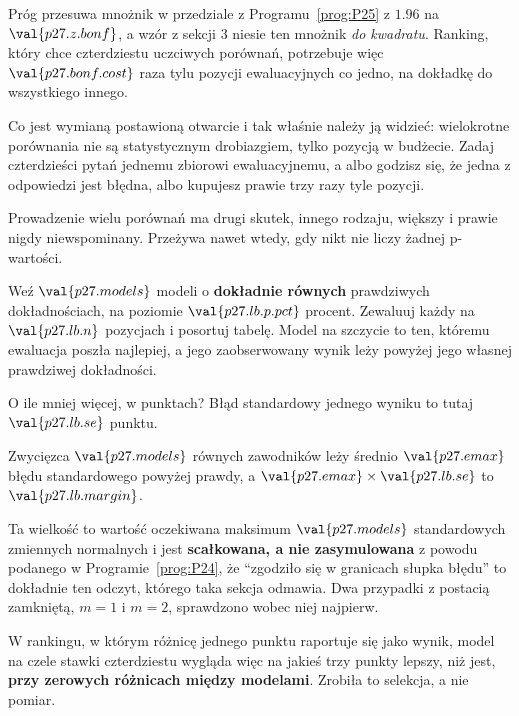\begin{fr}

Próg przesuwa mnożnik w przedziale z Programu~\ref{prog:P25} z
$\num{1.96}$ na $\val{p27.z.bonf}$, a wzór z sekcji 3 niesie ten mnożnik
\emph{do kwadratu}. Ranking, który chce czterdziestu uczciwych porównań,
potrzebuje więc $\val{p27.bonf.cost}$ raza tylu pozycji ewaluacyjnych co
jedno, na dokładkę do wszystkiego innego.

Co jest wymianą postawioną otwarcie i tak właśnie należy ją widzieć:
wielokrotne porównania nie są statystycznym drobiazgiem, tylko pozycją w
budżecie. Zadaj czterdzieści pytań jednemu zbiorowi ewaluacyjnemu, a albo
godzisz się, że jedna z odpowiedzi jest błędna, albo kupujesz prawie trzy razy
tyle pozycji.
\end{fr}

\begin{fr}
Prowadzenie wielu porównań ma drugi skutek, innego rodzaju, większy i prawie
nigdy niewspominany. Przeżywa nawet wtedy, gdy nikt nie liczy żadnej
p-wartości.

Weź $\val{p27.models}$ modeli o \textbf{dokładnie równych} prawdziwych
dokładnościach, na poziomie $\val{p27.lb.p.pct}$ procent. Zewaluuj każdy na
$\val{p27.lb.n}$ pozycjach i posortuj tabelę. Model na szczycie to ten, któremu ewaluacja poszła najlepiej, a jego
zaobserwowany wynik leży powyżej jego własnej prawdziwej dokładności.

O ile mniej więcej, w punktach? Błąd standardowy jednego wyniku to tutaj
$\val{p27.lb.se}$ punktu.
\dotline
\nextframe
\end{fr}

\begin{fr}

Zwycięzca $\val{p27.models}$ równych zawodników leży średnio
$\val{p27.emax}$ błędu standardowego powyżej prawdy, a
$\val{p27.emax} \times \val{p27.lb.se}$ to $\val{p27.lb.margin}$.

Ta wielkość to wartość oczekiwana maksimum $\val{p27.models}$ standardowych
zmiennych normalnych i jest \textbf{scałkowana, a nie zasymulowana} \dash{} z
powodu podanego w Programie~\ref{prog:P24}, że \enquote{zgodziło się w
granicach słupka błędu} to dokładnie ten odczyt, którego taka sekcja odmawia.
Dwa przypadki z postacią zamkniętą, $m = 1$ i $m = 2$, sprawdzono wobec niej
najpierw.


W rankingu, w którym różnicę jednego punktu raportuje się jako wynik, model na
czele stawki czterdziestu wygląda więc na jakieś trzy punkty lepszy, niż jest,
\textbf{przy zerowych różnicach między modelami}. Zrobiła to selekcja, a nie
pomiar.
\end{fr}

